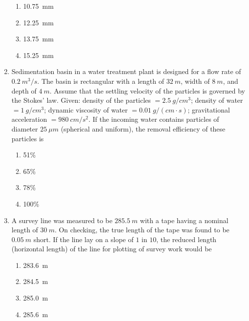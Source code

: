 \documentclass[12pt]{article}
\begin{document}
\begin{enumerate}[label= Q.\arabic*,start =26]
		\begin{multicols}{2}
			\begin{enumerate}[label=(\Alph*)]
				\item 10.75~mm
				\item 12.25~mm
				\item 13.75~mm
				\item 15.25~mm
			\end{enumerate}
		\end{multicols}

	\item Sedimentation basin in a water treatment plant is designed for a flow rate of $0.2~m^3/s$. The basin is rectangular with a length of $32~m$, width of $8~m$, and depth of $4~m$. Assume that the settling velocity of the particles is governed by the Stokes' law. Given: density of the particles $= 2.5~g/cm^3$; density of water $= 1~g/cm^3$; dynamic viscosity of water $= 0.01~g/(cm\cdot s)$; gravitational acceleration $= 980~cm/s^2$. If the incoming water contains particles of diameter $25~\mu m$ (spherical and uniform), the removal efficiency of these particles is

		\begin{multicols}{4}
			\begin{enumerate}[label=(\Alph*)]
				\item 51\%
				\item 65\%
				\item 78\%
				\item 100\%
			\end{enumerate}
		\end{multicols}

	\item A survey line was measured to be $285.5~m$ with a tape having a nominal length of $30~m$. On checking, the true length of the tape was found to be $0.05~m$ short. If the line lay on a slope of $1$ in $10$, the reduced length (horizontal length) of the line for plotting of survey work would be

		\begin{multicols}{4}
			\begin{enumerate}[label=(\Alph*)]
				\item 283.6~m
				\item 284.5~m
				\item 285.0~m
				\item 285.6~m
			\end{enumerate}
		\end{multicols}


\end{enumerate}
\end{document}
